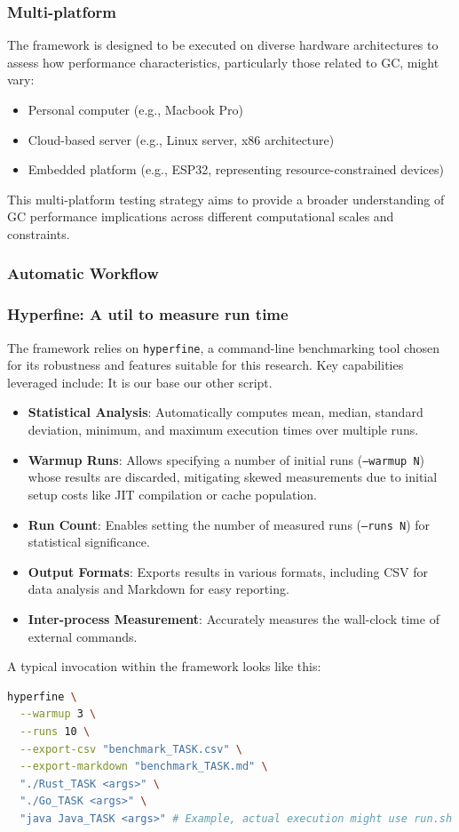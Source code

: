 \subsubsection{Multi-platform}
The framework is designed to be executed on diverse hardware architectures to assess how performance characteristics, particularly those related to GC, might vary:
\begin{itemize}
    \item Personal computer (e.g., Macbook Pro) 
    \item Cloud-based server (e.g., Linux server, x86 architecture) 
    \item Embedded platform (e.g., ESP32, representing resource-constrained devices) 
\end{itemize}
This multi-platform testing strategy aims to provide a broader understanding of GC performance implications across different computational scales and constraints.


\subsubsection{Automatic Workflow}

\subsubsection{Hyperfine: A util to measure run time}
The framework relies on \texttt{hyperfine}, a command-line benchmarking tool chosen for its robustness and features suitable for this research. Key capabilities leveraged include:
It is our base our other script.

\begin{itemize}
    \item \textbf{Statistical Analysis}: Automatically computes mean, median, standard deviation, minimum, and maximum execution times over multiple runs.
    \item \textbf{Warmup Runs}: Allows specifying a number of initial runs (\texttt{--warmup N}) whose results are discarded, mitigating skewed measurements due to initial setup costs like JIT compilation or cache population.
    \item \textbf{Run Count}: Enables setting the number of measured runs (\texttt{--runs N}) for statistical significance.
    \item \textbf{Output Formats}: Exports results in various formats, including CSV for data analysis and Markdown for easy reporting.
    \item \textbf{Inter-process Measurement}: Accurately measures the wall-clock time of external commands.
\end{itemize}
A typical invocation within the framework looks like this:
\begin{lstlisting}[language=bash, caption={Example hyperfine usage in benchmark.sh }, style=shstyle]
hyperfine \
  --warmup 3 \
  --runs 10 \
  --export-csv "benchmark_TASK.csv" \
  --export-markdown "benchmark_TASK.md" \
  "./Rust_TASK <args>" \
  "./Go_TASK <args>" \
  "java Java_TASK <args>" # Example, actual execution might use run.sh
\end{lstlisting}

